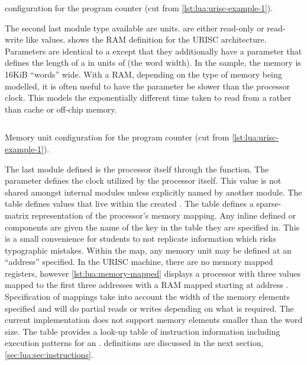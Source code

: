 \begin{listing}[h!]
    \inputminted[escapeinside=||, firstline=17, lastline=23]{lua}{./listings/urisc.lua}
    \caption{ configuration for the program counter (cut from \cref{lst:lua:urisc-example-1}).}
    \label{lst:lua:urisc:register}
\end{listing}

The second last module type available are  units.  are either read-only or read-write like  values.  shows the RAM definition for the URISC architecture. Parameters are identical to a  except that they additionally have a  parameter that defines the length of a  in units of  (the word width). In the sample, the memory is 16KiB ``words'' wide. With a RAM, depending on the type of memory being modelled, it is often useful to have the  parameter be slower than the processor clock. This models the exponentially different time taken to read from a  rather than cache or off-chip memory.

\begin{listing}[h!]
    \inputminted[escapeinside=||, firstline=35, lastline=42]{lua}{./listings/urisc.lua}
    \caption{Memory unit configuration for the program counter (cut from \cref{lst:lua:urisc-example-1}).}
    \label{lst:lua:urisc:memory}
\end{listing}

The last module defined is the processor itself through the  function. The  parameter defines the clock utilized by the processor itself. This value is not shared amongst internal modules unless explicitly named by another module. The  table defines  values that live within the created . The  table defines a sparse-matrix representation of the processor's memory mapping. Any inline defined  or  components are given the name of the key in the table they are specified in. This is a small convenience for students to not replicate information which risks typographic mistakes. Within the  map, any memory unit may be defined at an ``address'' specified. In the URISC machine, there are no memory mapped registers, however \cref{lst:lua:memory-mapped} displays a processor with three  values mapped to the first three addresses with a RAM mapped starting at address . Specification of  mappings take into account the width of the memory elements specified and will do partial reads or writes depending on what is required. The current implementation does not support memory elements smaller than the word size. The  table provides a look-up table of instruction information including execution patterns for an .  definitions are discussed in the next section, \cref{sec:lua:sec:instructions}.

